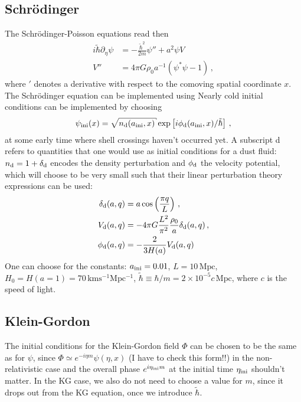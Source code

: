\documentclass[amsmath,amssymb,12pt, eqsecnum]{revtex4}
\begin{document}
\subsection{Schr\"odinger}
The Schr\"odinger-Poisson equations read then
\begin{align}
i \tilde{\hbar} \partial_\eta  \psi &= - \frac{\tilde{\hbar}^2}{2 m} \psi'' + a^2 \psi V\\
V'' &=  4 \pi G \rho_0 a^{-1} (\psi^* \psi -1)\,,
\end{align}
where $'$ denotes a derivative with respect to the comoving spatial coordinate $x$. The Schr\"odinger equation can be implemented using 
Nearly cold initial conditions can be implemented by choosing 
\begin{equation}\label{inipsi}
\psi_{\rm{ini}}(x)= \sqrt{n_{\rm d}(a_{\rm{ini}},x)} \exp\left[ i \phi_{\rm d}(a_{\rm{ini}},x)/\tilde \hbar \right]\,,
\end{equation}
at some early time where shell crossings haven't occurred yet. A subscript d refers to quantities that one would use as initial conditions for a dust fluid: $n_{\rm d} = 1 + \delta_{\rm d}$ encodes the density perturbation and $\phi_{\rm d}$ the velocity potential, which will choose to be very small such that their linear perturbation theory expressions can be used:
\begin{align} \label{delini}
\delta_{\rm d}(a,q) &= a \cos\left(\frac{\pi q}{L}\right) \,,\\
V_{\rm d}(a,q) &= -  4 \pi G \frac{L^2}{\pi^2} \frac{\rho_0}{a}  \delta_{\rm d}(a,q) \,,\\
\phi_{\rm d}(a,q) &= -\frac{2}{3 H(a)}V_{\rm d}(a,q)
\end{align}
One can choose for the constants: $a_{\rm ini} =0.01$, $L=10\,\mathrm{Mpc}$, $H_0 = H(a=1) = 70\,\mathrm{km s^{-1} Mpc^{-1}}$, $\tilde \hbar\equiv \hbar/m = 2\times 10^{-5} c\, \mathrm{Mpc}$, where $c$ is the speed of light.
\subsection{Klein-Gordon}
The initial conditions for the Klein-Gordon field $\Phi$ can be chosen to be the same as for $\psi$, since $\Phi \simeq e^{- i \eta m} \psi(\eta, x)$ (I have to check this form!!) in the non-relativistic case and the overall phase $e^{i \eta_{\rm ini} m}$ at the initial time $\eta_{\rm ini}$ shouldn't matter. In the KG case, we also do not need to choose a value for $m$, since it drops out from the KG equation, once we introduce $\tilde \hbar$.
\appendix
\end{document}
